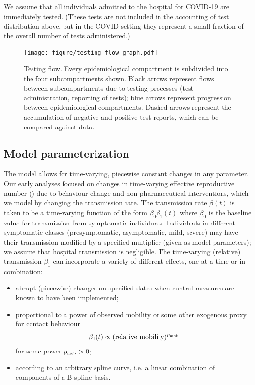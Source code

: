 \documentclass[12pt]{article}\usepackage[]{graphicx}\usepackage[]{color}
\begin{document}
We assume that all individuals admitted to the hospital for COVID-19 are immediately tested. (These tests
are not included in the accounting of test distribution above, but in the COVID setting
they represent a small fraction of the overall number of tests administered.)

\begin{figure}
  \texttt{[image: figure/testing\_flow\_graph.pdf]}
  \caption{Testing flow. Every epidemiological compartment
    is subdivided into the four subcompartments shown.
    Black arrows represent flows between subcompartments
    due to testing processes (test administration, reporting of tests);
    blue arrows represent progression between epidemiological compartments.
    Dashed arrows represent the accumulation of negative and positive test reports,
    which can be compared against data.
    }
  \label{fig:testing_flow}
\end{figure}

\subsection*{Model parameterization}

The model allows for time-varying, piecewise constant changes in any
parameter. Our early analyses focused on changes in time-varying effective reproductive
number (\Rt) due
to behaviour change and non-pharmaceutical interventions, which we model
by changing the transmission rate.
The transmission rate $\beta(t)$
is taken to be a time-varying function of the form
$\beta_0 \beta_1(t)$ 
where $\beta_0$ is the baseline value for transmission
from symptomatic individuals.
Individuals in different symptomatic classes (presymptomatic, asymptomatic, mild, severe)
may have their transmission modified by a specified multiplier (given as model parameters);
we assume that hospital transmission is negligible.
The time-varying (relative) transmission $\beta_1$ can incorporate a variety of different effects, one at a time or in combination:
\begin{itemize}
\item abrupt (piecewise) changes on specified dates when control
  measures are known to have been implemented;
\item proportional to a power of observed mobility or some other
  exogenous proxy for contact behaviour
\[
  \beta_1(t) \propto (\textrm{relative mobility})^{{{p}_{\textrm{\tiny mob}}}}
\]
for some power ${{p}_{\textrm{\tiny mob}}}>0$;
\item according to an arbitrary spline curve, i.e. a linear combination
  of components of a B-spline basis.
\end{itemize}
\end{document}

